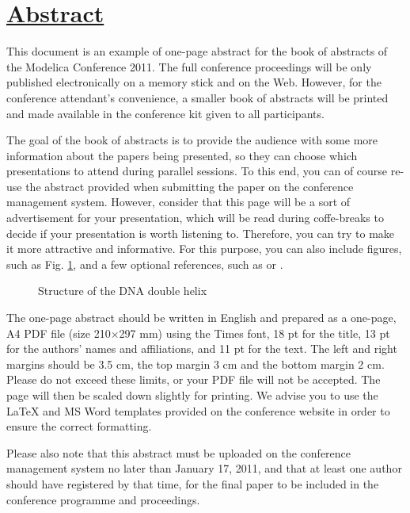 \pagebreak

\section*{\underline{Abstract}}

This document is an example of one-page abstract for the book of abstracts
of the Modelica Conference 2011. The full conference proceedings will be only published
electronically on a memory stick and on the Web. However, for the conference
attendant's convenience, a smaller book of abstracts will be printed and made available
in the conference kit given to all participants.

The goal of the book of abstracts is to provide the audience with some more information
about the papers being presented, so they can choose which presentations to attend during parallel
sessions. To this end, you can of course re-use the abstract provided when submitting the paper on 
the conference management system. However, consider that this page will be a sort of
advertisement for your presentation, which will be read during coffe-breaks to decide
if your presentation is worth listening to. Therefore, you can try to make it more 
attractive and informative. For this purpose, you can also 
include figures, such as Fig. \ref{fig5}, and a few optional references, such as \cite{dna}
or \cite{Modelica}.
\begin{figure}[h]
\centerline{}
\caption{Structure of the DNA double helix}
\label{fig5}
\end{figure}

The one-page abstract should be written in English and prepared as a one-page, A4 PDF file (size 210$\times$297 mm) using the Times font, 18 pt for the title, 13 pt for the authors' names and affiliations, 
and 11 pt for the text. The left and right margins should be 3.5 cm, the top margin 3 cm and the bottom margin
2 cm. Please do not exceed these limits, or your PDF file will not be accepted. The page will then be
scaled down slightly for printing. We advise you to use the {\LaTeX} and MS Word templates provided on the conference website in order to ensure the correct formatting.

Please also note that this abstract must be uploaded on the conference management
system no later than January 17, 2011, and that at least one author should have registered by that time,
for the final paper to be included in the conference programme and proceedings.






